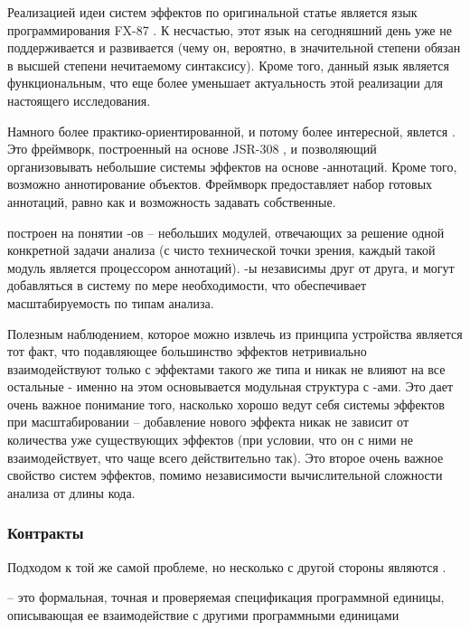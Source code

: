 Реализацией идеи систем эффектов по оригинальной статье является язык программирования FX-87 \cite{FX87}. К несчастью, этот язык на сегодняшний день уже не поддерживается и развивается (чему он, вероятно, в значительной степени обязан в высшей степени нечитаемому синтаксису). Кроме того, данный язык является функциональным, что еще более уменьшает актуальность этой реализации для настоящего исследования.

Намного более практико-ориентированной, и потому более интересной, явлется  \cite{checker-framework}. Это фреймворк, построенный на основе JSR-308 \cite{JSR308}, и позволяющий организовывать небольшие системы эффектов на основе -аннотаций. Кроме того, возможно аннотирование объектов. Фреймворк предоставляет набор готовых аннотаций, равно как и возможность задавать собственные.

 построен на понятии -ов -- небольших модулей, отвечающих за решение одной конкретной задачи анализа (с чисто технической точки зрения, каждый такой модуль является процессором аннотаций). -ы независимы друг от друга, и могут добавляться в систему по мере необходимости, что обеспечивает масштабируемость по типам анализа.

Полезным наблюдением, которое можно извлечь из принципа устройства  является тот факт, что подавляющее большинство эффектов нетривиально взаимодействуют только с эффектами такого же типа и никак не влияют на все остальные - именно на этом основывается модульная структура с -ами. Это дает очень важное понимание того, насколько хорошо ведут себя системы эффектов при масштабировании -- добавление нового эффекта никак не зависит от количества уже существующих эффектов (при условии, что он с ними не взаимодействует, что чаще всего действительно так). Это второе очень важное свойство систем эффектов, помимо независимости вычислительной сложности анализа от длины кода.








\subsubsection{Контракты}

Подходом к той же самой проблеме, но несколько с другой стороны являются .

\begin{definition}
	\label{def-contract}
	 -- это формальная, точная и проверяемая спецификация программной единицы, описывающая ее взаимодействие с другими программными единицами \cite{Meyer92}
\end{definition}

